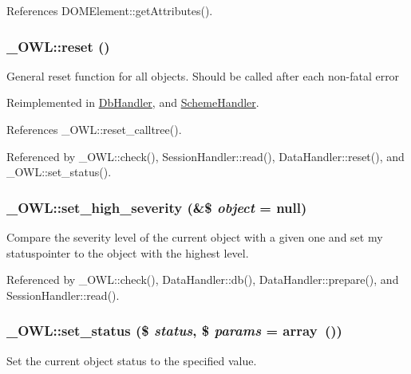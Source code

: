 References DOMElement::getAttributes().

\subsubsection[{reset}]{\setlength{\rightskip}{0pt plus 5cm}\_\-OWL::reset ()}\label{class__OWL_a2f2a042bcf31965194c03033df0edc9b}
General reset function for all objects. Should be called after each non-\/fatal error 

Reimplemented in \hyperlink{classDbHandler_a9982df4830f05803935bb31bac7fae3d}{DbHandler}, and \hyperlink{classSchemeHandler_aa25feb4a70d67b3d571904be4b2f50bc}{SchemeHandler}.



References \_\-OWL::reset\_\-calltree().



Referenced by \_\-OWL::check(), SessionHandler::read(), DataHandler::reset(), and \_\-OWL::set\_\-status().

\subsubsection[{set\_\-high\_\-severity}]{\setlength{\rightskip}{0pt plus 5cm}\_\-OWL::set\_\-high\_\-severity (\&\$ {\em object} = {\ttfamily null})}\label{class__OWL_a576829692a3b66e3d518853bf43abae3}
Compare the severity level of the current object with a given one and set my statuspointer to the object with the highest level. 

Referenced by \_\-OWL::check(), DataHandler::db(), DataHandler::prepare(), and SessionHandler::read().

\subsubsection[{set\_\-status}]{\setlength{\rightskip}{0pt plus 5cm}\_\-OWL::set\_\-status (\$ {\em status}, \/  \$ {\em params} = {\ttfamily array~()})}\label{class__OWL_aea912d0ede9b3c2a69b79072d94d4787}
Set the current object status to the specified value.


